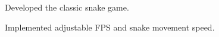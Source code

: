 \documentclass[letterpaper]{kevin-resume} %
\begin{document}
\begin{minipage}[t]{0.66\textwidth}

\begin{tightitemize}
 	\item Developed the classic snake game.
 	\item Implemented adjustable FPS and snake movement speed.
\end{tightitemize}

\sectionspace %


\end{minipage} %








\end{document}
